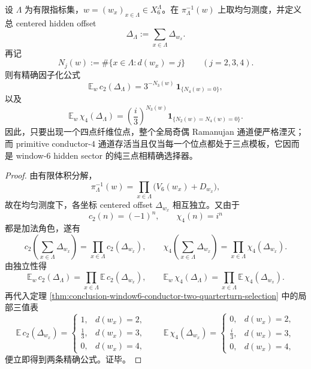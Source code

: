 \begin{theorem}\label{thm:conclusion-window6-finitevolume-conductor-two-quarterturn-selection}
设 \(\Lambda\) 为有限指标集，\(w=(w_x)_{x\in\Lambda}\in X_6^\Lambda\)。在 \(\pi_\Lambda^{-1}(w)\) 上取均匀测度，并定义总 centered hidden offset
\[
\Delta_\Lambda:=\sum_{x\in\Lambda}\Delta_{w_x}.
\]
再记
\[
N_j(w):=\#\{x\in\Lambda:d(w_x)=j\}
\qquad (j=2,3,4).
\]
则有精确因子化公式
\[
\mathbb E_w\,c_2(\Delta_\Lambda)
=
3^{-N_3(w)}\,\mathbf 1_{\{N_4(w)=0\}},
\]
以及
\[
\mathbb E_w\,\chi_4(\Delta_\Lambda)
=
\left(\frac{i}{3}\right)^{N_3(w)}\mathbf 1_{\{N_2(w)=N_4(w)=0\}}.
\]
因此，只要出现一个四点纤维位点，整个全局奇偶 Ramanujan 通道便严格湮灭；而 primitive conductor-\(4\) 通道存活当且仅当每一个位点都处于三点模板，它因而是 window-\(6\) hidden sector 的纯三点相精确选择器。
\end{theorem}
\begin{proof}
由有限体积分解，
\[
\pi_\Lambda^{-1}(w)
=
\prod_{x\in\Lambda}\bigl(V_6(w_x)+D_{w_x}\bigr),
\]
故在均匀测度下，各坐标 centered offset \(\Delta_{w_x}\) 相互独立。又由于
\[
c_2(n)=(-1)^n,\qquad \chi_4(n)=i^n
\]
都是加法角色，遂有
\[
c_2\!\left(\sum_{x\in\Lambda}\Delta_{w_x}\right)=\prod_{x\in\Lambda}c_2(\Delta_{w_x}),
\qquad
\chi_4\!\left(\sum_{x\in\Lambda}\Delta_{w_x}\right)=\prod_{x\in\Lambda}\chi_4(\Delta_{w_x}).
\]
由独立性得
\[
\mathbb E_w\,c_2(\Delta_\Lambda)=\prod_{x\in\Lambda}\mathbb E\,c_2(\Delta_{w_x}),
\qquad
\mathbb E_w\,\chi_4(\Delta_\Lambda)=\prod_{x\in\Lambda}\mathbb E\,\chi_4(\Delta_{w_x}).
\]
再代入定理 \ref{thm:conclusion-window6-conductor-two-quarterturn-selection} 中的局部三值表
\[
\mathbb E\,c_2(\Delta_{w_x})=
\begin{cases}
1,& d(w_x)=2,\\
\frac13,& d(w_x)=3,\\
0,& d(w_x)=4,
\end{cases}
\qquad
\mathbb E\,\chi_4(\Delta_{w_x})=
\begin{cases}
0,& d(w_x)=2,\\
\frac{i}{3},& d(w_x)=3,\\
0,& d(w_x)=4,
\end{cases}
\]
便立即得到两条精确公式。证毕。
\end{proof}


